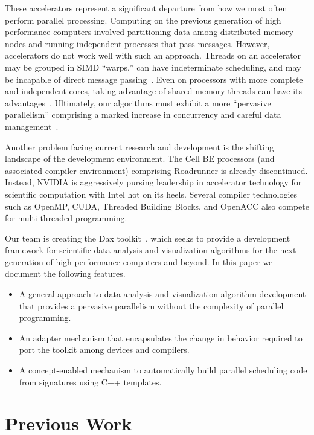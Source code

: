 \documentclass[conference]{IEEEtran}
\newcommand*{\lcite}[1]{~\cite{#1}}
\begin{document}
These accelerators represent a significant departure from how we most often
perform parallel processing.  Computing on the previous generation of high
performance computers involved partitioning data among distributed memory
nodes and running independent processes that pass messages.  However,
accelerators do not work well with such an approach.  Threads on an
accelerator may be grouped in SIMD ``warps,'' can have indeterminate
scheduling, and may be incapable of direct message passing\lcite{Sanders2011}.
Even on processors with more complete and independent cores, taking
advantage of shared memory threads can have its
advantages\lcite{Camp2010,Howison2011}.  Ultimately, our algorithms must
exhibit a more ``pervasive parallelism'' comprising a marked increase in
concurrency and careful data
management\lcite{ScientificDiscoveryExascale2011,ExascaleRoadMap}.

Another problem facing current research and development is the shifting
landscape of the development environment.  The Cell BE processors (and
associated compiler environment) comprising Roadrunner is already
discontinued.  Instead, NVIDIA is aggressively pursing leadership in
accelerator technology for scientific computation with Intel hot on its
heels.  Several compiler technologies such as OpenMP, CUDA, Threaded
Building Blocks, and OpenACC also compete for multi-threaded programming.

Our team is creating the Dax toolkit\lcite{Moreland2011:LDAV}, which seeks
to provide a development framework for scientific data analysis and
visualization algorithms for the next generation of high-performance
computers and beyond.  In this paper we document the following features.
\begin{itemize}
\item A general approach to data analysis and visualization algorithm
  development that provides a pervasive parallelism without the complexity
  of parallel programming.
\item An adapter mechanism that encapsulates the change in behavior
  required to port the toolkit among devices and compilers.
\item A concept-enabled mechanism to automatically build parallel
  scheduling code from signatures using C++ templates.
\end{itemize}

\section{Previous Work}
\label{sec:PreviousWork}
\end{document}
